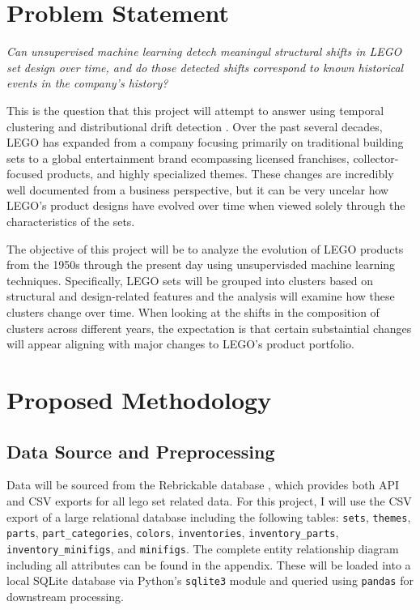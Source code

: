 \documentclass[11pt, letterpaper]{article}
\begin{document}
\section{Problem Statement}

\textit{Can unsupervised machine learning detech meaningul structural shifts in LEGO set design over time, and do those detected shifts correspond to known historical events in the company's history?}

This is the question that this project will attempt to answer using temporal clustering \cite{chi2007evolutionary} and distributional drift detection \cite{gama2014survey}. Over the past several decades, LEGO has expanded from a company focusing primarily on traditional building sets to a global entertainment brand ecompassing licensed franchises, collector-focused products, and highly specialized themes. These changes are incredibly well documented from a business perspective, but it can be very uncelar how LEGO's product designs have evolved over time when viewed solely through the characteristics of the sets. 

The objective of this project will be to analyze the evolution of LEGO products from the 1950s through the present day using unsupervisded machine learning techniques. Specifically, LEGO sets will be grouped into clusters based on structural and design-related features and the analysis will examine how these clusters change over time. When looking at the shifts in the composition of clusters across different years, the expectation is that certain substaintial changes will appear aligning with major changes to LEGO's product portfolio. 

\section{Proposed Methodology}

\subsection{Data Source and Preprocessing}

Data will be sourced from the Rebrickable database \cite{rebrickable2024}, which provides both API and CSV exports for all lego set related data. For this project, I will use the CSV export of a large relational database including the following tables: \texttt{sets}, \texttt{themes}, \texttt{parts}, \texttt{part\_categories}, \texttt{colors}, \texttt{inventories}, \texttt{inventory\_parts}, \texttt{inventory\_minifigs}, and \texttt{minifigs}. The complete entity relationship diagram including all attributes can be found in the appendix. These will be loaded into a local SQLite database via Python's \texttt{sqlite3} module and queried using \texttt{pandas} for downstream processing. 
\end{document}
